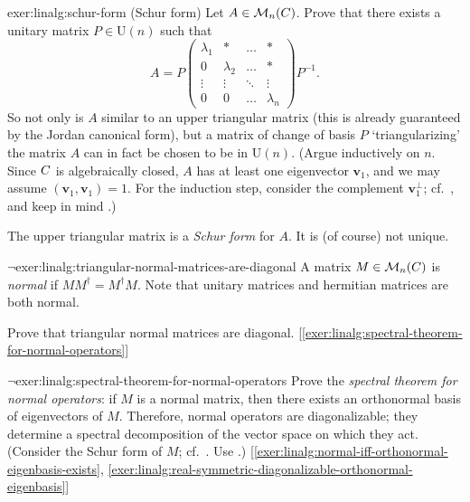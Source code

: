 \begin{exer}{}{exer:linalg:schur-form}
  (Schur form) Let $A \in \mathcal{M}_n(C)$. Prove that there exists
  a unitary matrix $P \in \mathrm{U}(n)$ such that
  \[
    A = P \begin{pmatrix}
      \lambda_1 & \ast & \dots & \ast \\
      0 & \lambda_2 & \dots & \ast \\
      \vdots & \vdots & \ddots & \vdots \\
      0 & 0 & \dots & \lambda_n
    \end{pmatrix} P^{-1}.
  \]
  So not only is $A$ similar to an upper triangular matrix (this is
  already guaranteed by the Jordan canonical form), but a matrix of
  change of basis $P$ `triangularizing' the matrix $A$ can in fact be
  chosen to be in $\mathrm{U}(n)$. (Argue inductively on $n$. Since
  $C$ is algebraically closed, $A$ has at least one eigenvector
  $\mathbf{v}_1$, and we may assume
  $(\mathbf{v}_1, \mathbf{v}_1) = 1$.  For the induction step,
  consider the complement $\mathbf{v}_1^\perp$; cf.\
  ,
  and keep in mind
  .)

  The upper triangular matrix is a \emph{Schur form} for $A$. It is
  (of course) not unique.
\end{exer}
\begin{exer}{$\lnot$}{exer:linalg:triangular-normal-matrices-are-diagonal}
  A matrix $M \in \mathcal{M}_n(C)$ is \emph{normal} if
  $MM^\dagger = M^\dagger M$. Note that unitary matrices and hermitian
  matrices are both normal.

  Prove that triangular normal matrices are
  diagonal. [\ref{exer:linalg:spectral-theorem-for-normal-operators}]
\end{exer}
\begin{exer}{$\lnot$}{exer:linalg:spectral-theorem-for-normal-operators}
  Prove the \emph{spectral theorem for normal operators}: if $M$ is a
  normal matrix, then there exists an orthonormal basis of
  eigenvectors of $M$. Therefore, normal operators are diagonalizable;
  they determine a spectral decomposition of the vector space on which
  they act.  (Consider the Schur form of $M$; cf.\
  .  Use
  .)
  [\ref{exer:linalg:normal-iff-orthonormal-eigenbasis-exists},
  \ref{exer:linalg:real-symmetric-diagonalizable-orthonormal-eigenbasis}]
\end{exer}
